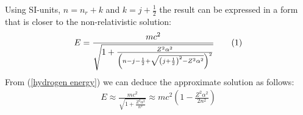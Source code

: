 \documentclass[a4paper,12pt]{article}
\newcommand\numberthis{\addtocounter{equation}{1}\tag{\theequation}}
\newcommand{\kla}{}
\begin{document}
Using SI-units, $n= n_r+k$ and $k=j+\frac{1}{2}$ the result can be expressed in a form that is closer to the non-relativistic solution:
\begin{align*}
E=\frac{mc^2}{\sqrt{1+\frac{Z^2\alpha^2}{\kla\left( {n-j-\frac{1}{2}+\sqrt{\kla\left( {j+\frac{1}{2}} \right)^2-Z^2\alpha^2}} \right)^2}}}\numberthis\label{hydrogen energy}
\end{align*}
From (\ref{hydrogen energy}) we can deduce the approximate solution as follows:
\begin{align*}
E\approx\frac{mc^2}{\sqrt{1+\frac{Z^2\alpha^2}{n^2}}}\approx mc^2\kla\left( {1-\frac{Z^2\alpha^2}{2n^2}} \right)
\end{align*}
\end{document}
